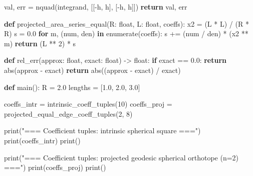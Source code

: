 \documentclass[
  12pt,
  a4paper,
]{article}
\newenvironment{Shaded}{}{}
\newcommand{\BuiltInTok}[1]{\textcolor[rgb]{0.00,0.50,0.00}{#1}}
\newcommand{\ControlFlowTok}[1]{\textcolor[rgb]{0.00,0.44,0.13}{\textbf{#1}}}
\newcommand{\DecValTok}[1]{\textcolor[rgb]{0.25,0.63,0.44}{#1}}
\newcommand{\FloatTok}[1]{\textcolor[rgb]{0.25,0.63,0.44}{#1}}
\newcommand{\KeywordTok}[1]{\textcolor[rgb]{0.00,0.44,0.13}{\textbf{#1}}}
\newcommand{\NormalTok}[1]{#1}
\newcommand{\OperatorTok}[1]{\textcolor[rgb]{0.40,0.40,0.40}{#1}}
\newcommand{\StringTok}[1]{\textcolor[rgb]{0.25,0.44,0.63}{#1}}
\begin{document}
\begin{Shaded}
\begin{Highlighting}[]
\NormalTok{    val, err }\OperatorTok{=}\NormalTok{ nquad(integrand, [[}\OperatorTok{{-}}\NormalTok{h, h], [}\OperatorTok{{-}}\NormalTok{h, h]])}
    \ControlFlowTok{return}\NormalTok{ val, err}


\KeywordTok{def}\NormalTok{ projected\_area\_series\_equal(R: }\BuiltInTok{float}\NormalTok{, L: }\BuiltInTok{float}\NormalTok{, coeffs):}
\NormalTok{    x2 }\OperatorTok{=}\NormalTok{ (L }\OperatorTok{*}\NormalTok{ L) }\OperatorTok{/}\NormalTok{ (R }\OperatorTok{*}\NormalTok{ R)}
\NormalTok{    s }\OperatorTok{=} \FloatTok{0.0}
    \ControlFlowTok{for}\NormalTok{ m, (num, den) }\KeywordTok{in} \BuiltInTok{enumerate}\NormalTok{(coeffs):}
\NormalTok{        s }\OperatorTok{+=}\NormalTok{ (num }\OperatorTok{/}\NormalTok{ den) }\OperatorTok{*}\NormalTok{ (x2 }\OperatorTok{**}\NormalTok{ m)}
    \ControlFlowTok{return}\NormalTok{ (L }\OperatorTok{**} \DecValTok{2}\NormalTok{) }\OperatorTok{*}\NormalTok{ s}


\KeywordTok{def}\NormalTok{ rel\_err(approx: }\BuiltInTok{float}\NormalTok{, exact: }\BuiltInTok{float}\NormalTok{) }\OperatorTok{{-}\textgreater{}} \BuiltInTok{float}\NormalTok{:}
    \ControlFlowTok{if}\NormalTok{ exact }\OperatorTok{==} \FloatTok{0.0}\NormalTok{:}
        \ControlFlowTok{return} \BuiltInTok{abs}\NormalTok{(approx }\OperatorTok{{-}}\NormalTok{ exact)}
    \ControlFlowTok{return} \BuiltInTok{abs}\NormalTok{((approx }\OperatorTok{{-}}\NormalTok{ exact) }\OperatorTok{/}\NormalTok{ exact)}


\KeywordTok{def}\NormalTok{ main():}
\NormalTok{    R }\OperatorTok{=} \FloatTok{2.0}
\NormalTok{    lengths }\OperatorTok{=}\NormalTok{ [}\FloatTok{1.0}\NormalTok{, }\FloatTok{2.0}\NormalTok{, }\FloatTok{3.0}\NormalTok{]}

\NormalTok{    coeffs\_intr }\OperatorTok{=}\NormalTok{ intrinsic\_coeff\_tuples(}\DecValTok{10}\NormalTok{)}
\NormalTok{    coeffs\_proj }\OperatorTok{=}\NormalTok{ projected\_equal\_edge\_coeff\_tuples(}\DecValTok{2}\NormalTok{, }\DecValTok{8}\NormalTok{)}

    \BuiltInTok{print}\NormalTok{(}\StringTok{"=== Coefficient tuples: intrinsic spherical square ==="}\NormalTok{)}
    \BuiltInTok{print}\NormalTok{(coeffs\_intr)}
    \BuiltInTok{print}\NormalTok{()}

    \BuiltInTok{print}\NormalTok{(}\StringTok{"=== Coefficient tuples: projected geodesic spherical orthotope (n=2) ==="}\NormalTok{)}
    \BuiltInTok{print}\NormalTok{(coeffs\_proj)}
    \BuiltInTok{print}\NormalTok{()}


\end{Highlighting}
\end{Shaded}
\end{document}

